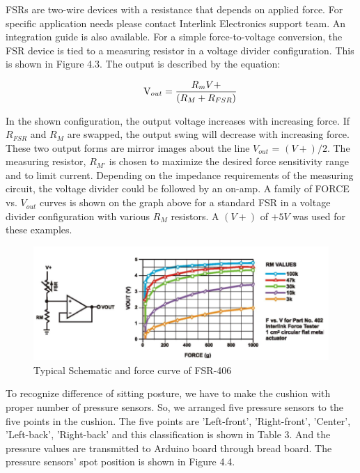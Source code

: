 \documentclass[conference]{IEEEtran}
\begin{document}
FSRs are two-wire devices with a resistance that depends on applied force. For specific application needs please contact Interlink Electronics support team. An integration guide is also available. For a simple force-to-voltage conversion, the FSR device is tied to a measuring resistor in a voltage divider configuration. This is shown in Figure 4.3. The output is described by the equation:


\begin{displaymath}
\qquad\mathrm{V}_{out} =\frac{{R}_mV+}{({R}_M+{R}_{FSR})}\\
\end{displaymath}

In the shown configuration, the output voltage increases with increasing force. If ${R}_{FSR}$ and ${R}_{M}$ are swapped, the output swing will decrease with increasing force. These two output forms are mirror images about the line ${V}_{out}$  = $(V+) / 2$. The measuring resistor, ${R}_{M'}$ is chosen to maximize the desired force sensitivity range and to limit current. Depending on the impedance requirements of the measuring circuit, the voltage divider could be followed by an on-amp. A family of FORCE vs. ${V}_{out}$ curves is shown on the graph above for a standard FSR in a voltage divider configuration with various ${R}_{M}$ resistors. A $(V+)$ of $+5V$ was used for these examples.

\begin{figure}[htbp]
\begin{center}
    \includegraphics[scale=0.375]{img_07.png}
    \caption{Typical Schematic and force curve of FSR-406} 
\end{center}
\end{figure}

To recognize difference of sitting posture, we have to make the cushion with proper number of pressure sensors. So, we arranged five pressure sensors to the five points in the cushion. The five points are 'Left-front', 'Right-front', 'Center', 'Left-back', 'Right-back' and this classification is shown in Table 3. And the pressure values are transmitted to Arduino board through bread board. The pressure sensors' spot position is shown in Figure 4.4.
\end{document}
